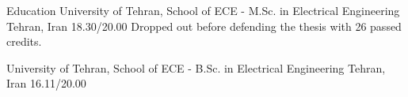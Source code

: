 \documentclass[../professional-cv.tex]{subfiles}
\begin{document}
	\begin{rSection}{ Education }
		\rEducationSubsectionHeading
		{University of Tehran, School of ECE}
		{  -  }
		{M.Sc. in Electrical Engineering}
		{Tehran, Iran}
		{18.30/20.00}
		{Dropped out before defending the thesis with 26 passed credits.}

		\rEducationSubsectionHeading
		{University of Tehran, School of ECE}
		{  -  }
		{B.Sc. in Electrical Engineering}
		{Tehran, Iran}
		{16.11/20.00}
		{}
	\end{rSection}
\end{document}
